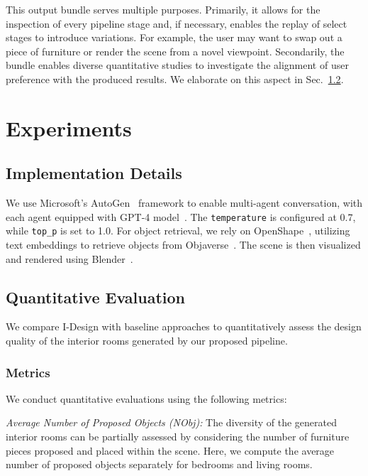 \documentclass[runningheads]{llncs}
\newcommand{\methodname}{I-Design\xspace}
\begin{document}
This output bundle serves multiple purposes. 
Primarily, it allows for the inspection of every pipeline stage and, if necessary, enables the replay of select stages to introduce variations. 
For example, the user may want to swap out a piece of furniture or render the scene from a novel viewpoint. 
Secondarily, the bundle enables diverse quantitative studies to investigate the alignment of user preference with the produced results. 
We elaborate on this aspect in Sec.~\ref{sec:quantitative}.

\section{Experiments}
\subsection{Implementation Details}

We use Microsoft's AutoGen~\cite{wu2023autogen} framework to enable multi-agent conversation, with each agent equipped with GPT-4 model~\cite{achiam2023gpt}. The \texttt{temperature} is configured at 0.7, while \texttt{top\_p} is set to 1.0. For object retrieval, we rely on OpenShape~\cite{liu2024openshape}, utilizing text embeddings to retrieve objects from Objaverse~\cite{deitke2023objaverse}. The scene is then visualized and rendered using Blender~\cite{blender}.

\subsection{Quantitative Evaluation}
\label{sec:quantitative}

We compare \methodname with baseline approaches to quantitatively assess the design quality of the interior rooms generated by our proposed pipeline.

\subsubsection{Metrics}
\label{sec:metrics}

We conduct quantitative evaluations using the following metrics:

\noindent
\textit{Average Number of Proposed Objects (NObj): } 
The diversity of the generated interior rooms can be partially assessed by considering the number of furniture pieces proposed and placed within the scene. Here, we compute the average number of proposed objects separately for bedrooms and living rooms. 
\end{document}
